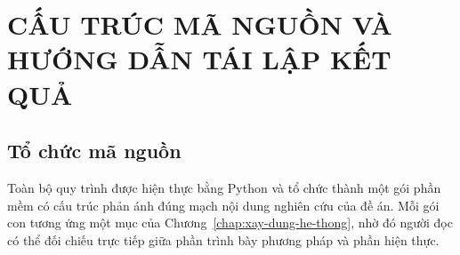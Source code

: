 
\chapter{CẤU TRÚC MÃ NGUỒN VÀ HƯỚNG DẪN TÁI LẬP KẾT QUẢ}
\label{app:source}

\section{Tổ chức mã nguồn}

Toàn bộ quy trình được hiện thực bằng Python và tổ chức thành một gói phần mềm có
cấu trúc phản ánh đúng mạch nội dung nghiên cứu của đề án. Mỗi gói con tương ứng
một mục của Chương~\ref{chap:xay-dung-he-thong}, nhờ đó người đọc có thể đối
chiếu trực tiếp giữa phần trình bày phương pháp và phần hiện thực.

